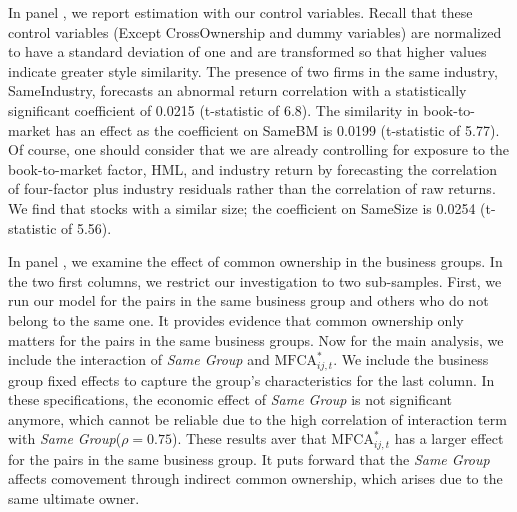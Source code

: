 	In panel , we report estimation with our control variables. Recall that these control variables (Except CrossOwnership and dummy variables) are normalized to have a standard deviation of one and are transformed so that higher values indicate greater style similarity. The presence of two firms in the same industry, SameIndustry, forecasts an abnormal return correlation with a statistically significant coefficient of 0.0215 (t-statistic of 6.8). The similarity in book-to-market has an effect as the coefficient on SameBM is 0.0199 (t-statistic of 5.77). Of course, one should consider that we are already controlling for exposure to the book-to-market factor, HML, and industry return by forecasting the correlation of four-factor plus industry residuals rather than the correlation of raw returns. We find that stocks with a similar size; the coefficient on SameSize is 0.0254 (t-statistic of 5.56). 
	
	
	
	In panel , we examine the effect of common ownership in the business groups. In the two first columns, we restrict our investigation to two sub-samples. First, we run our model for the pairs in the same business group and others who do not belong to the same one. It provides evidence that common ownership only matters for the pairs in the same business groups.	
	Now for the main analysis, we include the interaction of \textit{Same Group} and $\text{MFCA}^*_{ij,t}$. We include the business group fixed effects to capture the group's characteristics for the last column. In these specifications, the economic effect of \textit{Same Group} is not significant anymore, which cannot be reliable due to the high correlation of interaction term with \textit{Same Group}($\rho = 0.75$). These results aver that $\text{MFCA}^*_{ij,t}$ has a larger effect for the pairs in the same business group. It puts forward that the \textit{Same Group}  affects comovement through indirect common ownership, which arises due to the same ultimate owner. 
	
	
	
